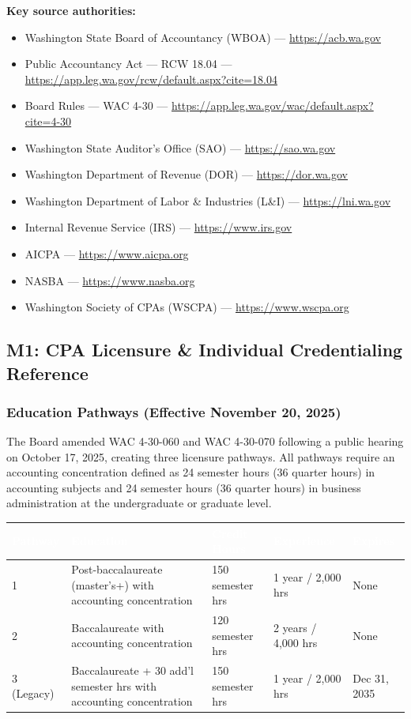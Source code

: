 \documentclass[11pt,letterpaper]{article}
\newcommand{\tableheader}[1]{\textbf{\sffamily\textcolor{white}{#1}}}
\begin{document}
\textbf{Key source authorities:}
\begin{itemize}[leftmargin=2em]
  \item Washington State Board of Accountancy (WBOA) --- \url{https://acb.wa.gov}
  \item Public Accountancy Act --- RCW 18.04 --- \url{https://app.leg.wa.gov/rcw/default.aspx?cite=18.04}
  \item Board Rules --- WAC 4-30 --- \url{https://app.leg.wa.gov/wac/default.aspx?cite=4-30}
  \item Washington State Auditor's Office (SAO) --- \url{https://sao.wa.gov}
  \item Washington Department of Revenue (DOR) --- \url{https://dor.wa.gov}
  \item Washington Department of Labor \& Industries (L\&I) --- \url{https://lni.wa.gov}
  \item Internal Revenue Service (IRS) --- \url{https://www.irs.gov}
  \item AICPA --- \url{https://www.aicpa.org}
  \item NASBA --- \url{https://www.nasba.org}
  \item Washington Society of CPAs (WSCPA) --- \url{https://www.wscpa.org}
\end{itemize}

\subsection{M1: CPA Licensure \& Individual Credentialing Reference}

\subsubsection{Education Pathways (Effective November 20, 2025)}

The Board amended WAC 4-30-060 and WAC 4-30-070 following a public hearing on October 17, 2025, creating three licensure pathways. All pathways require an accounting concentration defined as 24 semester hours (36 quarter hours) in accounting subjects and 24 semester hours (36 quarter hours) in business administration at the undergraduate or graduate level.

\begin{center}
\begin{tabularx}{\textwidth}{L{2cm}L{3.5cm}L{3cm}L{2.5cm}C{2cm}}
\toprule
{}
\tableheader{Pathway} & \tableheader{Education} & \tableheader{Credit Hours} & \tableheader{Experience} & \tableheader{Expires} \\
 & Post-baccalaureate (master's+) with accounting concentration & 150 semester hrs & 1 year / 2,000 hrs & None \\
2 & Baccalaureate with accounting concentration & 120 semester hrs & 2 years / 4,000 hrs & None \\
3 (Legacy) & Baccalaureate + 30 add'l semester hrs with accounting concentration & 150 semester hrs & 1 year / 2,000 hrs & Dec 31, 2035 \\
\bottomrule
\end{tabularx}
\end{center}
\end{document}
